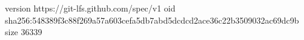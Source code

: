 version https://git-lfs.github.com/spec/v1
oid sha256:548389f3c88f269a57a603cefa5db7abd5dcdcd2ace36c22b3509032ac69dc9b
size 36339
